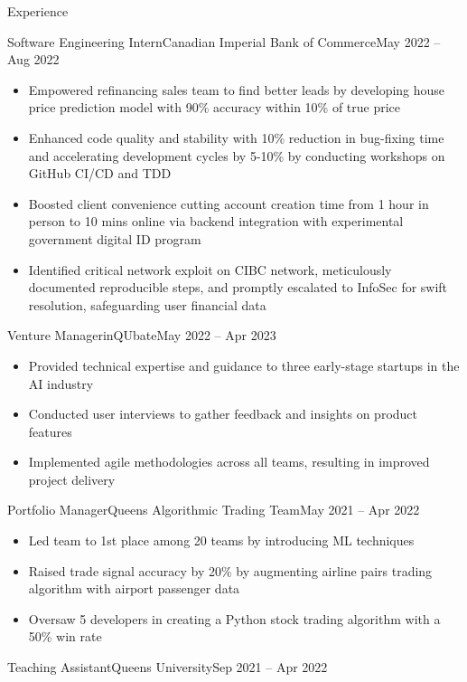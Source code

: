 \documentclass[]{mcdowellcv}
\begin{document}
\begin{cvsection}{Experience}
\begin{cvsubsection}{Software Engineering Intern}{Canadian Imperial Bank of Commerce}{May 2022 -- Aug 2022}
		\begin{itemize}%
			\item Empowered refinancing sales team to find better leads by developing house price prediction model with 90\% accuracy within 10\% of true price
			\item Enhanced code quality and stability with 10\% reduction in bug-fixing time and accelerating development cycles by 5-10\% by conducting workshops on GitHub CI/CD and TDD
			\item Boosted client convenience cutting account creation time from 1 hour in person to 10 mins online via backend integration with experimental government digital ID program
			\item Identified critical network exploit on CIBC network, meticulously documented reproducible steps, and promptly escalated to InfoSec for swift resolution, safeguarding user financial data
		\end{itemize}
	\end{cvsubsection}
	\begin{cvsubsection}{Venture Manager}{inQUbate}{May 2022 -- Apr 2023}   
		\begin{itemize}%
			\item Provided technical expertise and guidance to three early-stage startups in the AI industry
			\item Conducted user interviews to gather feedback and insights on product features
			\item Implemented agile methodologies across all teams, resulting in improved project delivery
		\end{itemize}
	\end{cvsubsection}
	\begin{cvsubsection}{Portfolio Manager}{Queen\textquotesingle{}s Algorithmic Trading Team}{May 2021 -- Apr 2022}
		            
		\begin{itemize}%
			\item Led team to 1st place among 20 teams by introducing ML techniques
			\item Raised trade signal accuracy by 20\% by augmenting airline pairs trading algorithm with airport passenger data
			\item Oversaw 5 developers in creating a Python stock trading algorithm with a 50\% win rate
		\end{itemize}
	\end{cvsubsection}
	\begin{cvsubsection}{Teaching Assistant}{Queen\textquotesingle{}s University}{Sep 2021 -- Apr 2022}
		            

\end{cvsubsection}
\end{cvsection}
\end{document}
